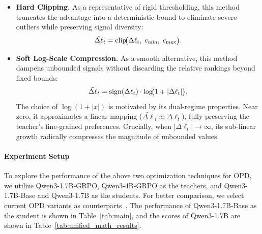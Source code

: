 \documentclass[11pt]{article}
\begin{document}
\begin{itemize}[leftmargin=*,nosep]
    \item \textbf{Hard Clipping.} As a representative of rigid thresholding, this method truncates the advantage into a deterministic bound to eliminate severe outliers while preserving signal diversity:
    \begin{equation}
    \small
    \label{eq:adv-clip}
    \tilde{\Delta\ell}_t = \mathrm{clip}\!\bigl(\Delta\ell_t,\; c_{\min},\; c_{\max}\bigr).
    \end{equation}

    \item \textbf{Soft Log-Scale Compression.} As a smooth alternative, this method dampens unbounded signals without discarding the relative rankings beyond fixed bounds:
    \begin{equation}
    \label{eq:adv-logscale}
    \small
    \tilde{\Delta\ell}_t = \mathrm{sign}(\Delta\ell_t) \cdot \log\!\bigl(1 + |\Delta\ell_t|\bigr).
    \end{equation}
    The choice of $\log(1+|x|)$ is motivated by its dual-regime properties. Near zero, it approximates a linear mapping ($\tilde{\Delta\ell}_t \approx \Delta\ell_t$), fully preserving the teacher's fine-grained preferences. Crucially, when $|\Delta\ell_t| \to \infty$, its sub-linear growth radically compresses the magnitude of unbounded values. 
\end{itemize}

\paragraph{Experiment Setup} 
To explore the performance of the above two optimization techniques for OPD, we utilize Qwen3-1.7B-GRPO, Qwen3-4B-GRPO as the teachers, and Qwen3-1.7B-Base and Qwen3-1.7B as the students. 
For better comparison, we select current OPD variants as counterparts~\cite{eopd,gopd,hou2026uni}.
The performance of Qwen3-1.7B-Base as the student is shown in Table~\ref{tab:main}, and the scores of Qwen3-1.7B are shown in Table~\ref{tab:unified_math_results}.
\end{document}
